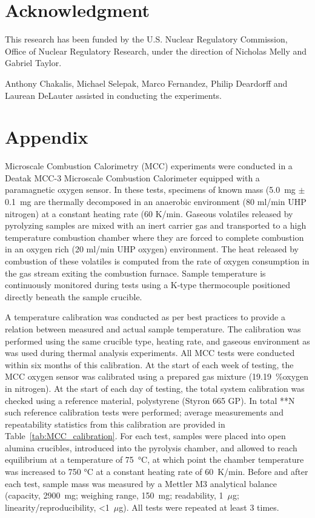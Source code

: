 \documentclass[12pt]{article}
\begin{document}
\section{Acknowledgment}

This research has been funded by the U.S. Nuclear Regulatory Commission, Office of Nuclear Regulatory Research, under the direction of Nicholas Melly and Gabriel Taylor.

Anthony Chakalis, Michael Selepak, Marco Fernandez, Philip Deardorff and Laurean DeLauter assisted in conducting the experiments.



\clearpage
\section{Appendix}
Microscale Combustion Calorimetry (MCC) experiments were conducted in a Deatak MCC-3 Microscale Combustion Calorimeter equipped with a paramagnetic oxygen sensor. In these tests, specimens of known mass (5.0~mg $\pm$ 0.1~mg are thermally decomposed in an anaerobic environment (80 ml/min UHP nitrogen) at a constant heating rate (60 K/min. Gaseous volatiles released by pyrolyzing samples are mixed with an inert carrier gas and transported to a high temperature combustion chamber where they are forced to complete combustion in an oxygen rich (20 ml/min UHP oxygen) environment. The heat released by combustion of these volatiles is computed from the rate of oxygen consumption in the gas stream exiting the combustion furnace. Sample temperature is continuously monitored during tests using a K-type thermocouple positioned directly beneath the sample crucible.

A temperature calibration was conducted as per best practices \cite{ASTM_D7309} to provide a relation between measured and actual sample temperature. The calibration was performed using the same crucible type, heating rate, and gaseous environment as was used during thermal analysis experiments. All MCC tests were conducted within six months of this calibration. At the start of each week of testing, the MCC oxygen sensor was calibrated using a prepared gas mixture (19.19~\%oxygen in nitrogen). At the start of each day of testing, the total system calibration was checked using a reference material, polystyrene (Styron 665 GP). In total **N such reference calibration tests were performed; average measurements and repeatability statistics from this calibration are provided in Table~\ref{tab:MCC_calibration}. For each test, samples were placed into open alumina crucibles, introduced into the pyrolysis chamber, and allowed to reach equilibrium at a temperature of 75~°C, at which point the chamber temperature was increased to 750 °C at a constant heating rate of 60~K/min. Before and after each test, sample mass was measured by a Mettler M3 analytical balance (capacity, 2900~mg; weighing range, 150~mg; readability, 1~$\mu$g; linearity/reproducibility, <1~$\mu$g). All tests were repeated at least 3 times.
\end{document}
